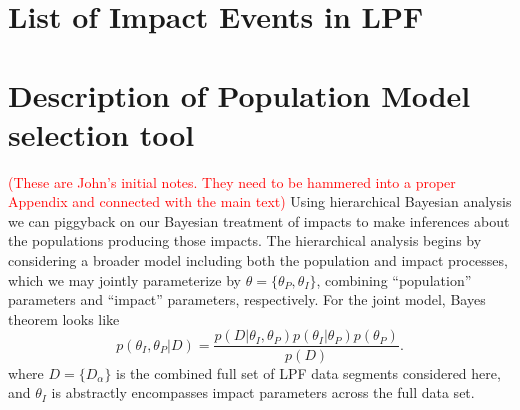 \documentclass[twocolumn, trackchanges]{aastex62}
\newcommand{\red}[1]{\textcolor{red}{#1}}
\begin{document}




 \appendix
 \section{List of Impact Events in LPF}


\appendix
\section{Description of Population Model selection tool}
\red{(These are John's initial notes. They need to be hammered into a proper Appendix and connected with the main text)}
Using hierarchical Bayesian analysis we can piggyback on our Bayesian treatment of impacts to make inferences about the populations producing those impacts. The hierarchical analysis begins by considering a broader model including both the population and impact processes, which we may jointly parameterize by $\theta=\{\theta_P,\theta_I\}$, combining ``population'' parameters and ``impact'' parameters, respectively.  For the joint model, Bayes theorem looks like
\begin{equation}
  p(\theta_I,\theta_P|D)=\frac{p(D|\theta_I,\theta_P)p(\theta_I|\theta_P)p(\theta_P)}{p(D)}.
\end{equation}
where $D=\{D_\alpha\}$ is the combined full set of LPF data segments considered here, and $\theta_I$ is abstractly encompasses impact parameters across the full data set.
\end{document}
